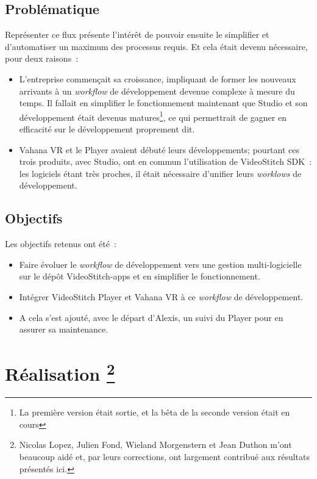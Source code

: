 \subsection{Problématique}
Représenter ce flux présente l'intérêt de pouvoir ensuite le simplifier et d'automatiser
un maximum des processus requis. Et cela était devenu nécessaire, pour deux raisons~:
\begin{itemize}
  \item L'entreprise commençait sa croissance, impliquant de former les nouveaux arrivants
  à un \textit{workflow} de développement devenue complexe à mesure du temps. Il fallait en
  simplifier le fonctionnement maintenant que Studio et son développement était
  devenus matures\footnote{La première version était sortie, et la bêta de la seconde
  version était en cours}, ce qui permettrait de gagner en efficacité sur le développement
  proprement dit.
  \item Vahana VR et le Player avaient débuté leurs développements; pourtant ces trois
  produits, avec Studio, ont en commun l'utilisation de VideoStitch SDK~: les logiciels
  étant très proches, il était nécessaire d'unifier leurs \textit{worklows} de développement.
\end{itemize}

\subsection{Objectifs}
Les objectifs retenus ont été~:
\begin{itemize}
  \item Faire évoluer le \textit{workflow} de développement vers une gestion multi-logicielle sur le dépôt VideoStitch-apps 
  et en simplifier le fonctionnement.
  \item Intégrer VideoStitch Player et Vahana VR à ce \textit{workflow} de développement.
  \item A cela s'est ajouté, avec le départ d'Alexis, un suivi du Player pour en assurer
  sa maintenance.
\end{itemize}


\section[Réalisation]{Réalisation
\protect\footnote{Nicolas Lopez, Julien Fond, Wieland Morgenstern et Jean Duthon m'ont beaucoup aidé et, par 
leurs corrections, ont largement contribué aux résultats présentés ici.}}

